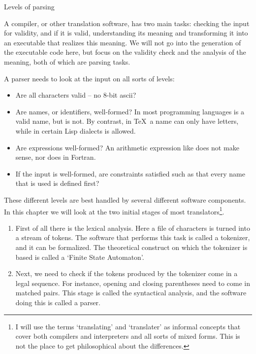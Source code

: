  {Levels of parsing}

A compiler, or other translation software, has two main tasks:
checking the input for validity, and if it is valid, understanding its
meaning and transforming it into an executable that realizes this
meaning. We will not go into the generation of the executable code here,
but focus on the validity check and the analysis of the meaning, both
of which are parsing tasks.

A parser needs to look at the input on all sorts of levels:
\begin{itemize}
\item Are all characters valid -- no 8-bit ascii?
\item Are names, or identifiers, well-formed? In most programming
  languages  is a valid name, but  is not. By contrast, in
  \TeX\ a name can only have letters, while in certain Lisp dialects
   is allowed.
\item Are expressions well-formed? An arithmetic expression like
   does not make sense, nor does  in Fortran.
\item If the input is well-formed, are constraints satisfied such as
  that every name that is used is defined first?
\end{itemize}

These different levels are best handled by several different
software components. In this chapter we will look at the two initial
stages of most translators\footnote{I will use the terms `translating'
  and `translater' as informal concepts that cover both compilers and
  interpreters and all sorts of mixed forms. This is not the place to
  get philosophical about the differences.}.
\begin{enumerate}
\item First of all there is the lexical analysis. Here a file of
  characters is turned into a stream of tokens. The
  software that performs this task is called a
  tokenizer, and it can be formalized. The
  theoretical construct on which the tokenizer is based is called a
  `Finite State Automaton'.
\item Next, we need to check if the tokens produced by the tokenizer
  come in a legal sequence. For instance, opening and closing
  parentheses need to come in matched pairs. This stage is called the
  syntactical
  analysis, and the software doing this is called a
  parser.
\end{enumerate}

